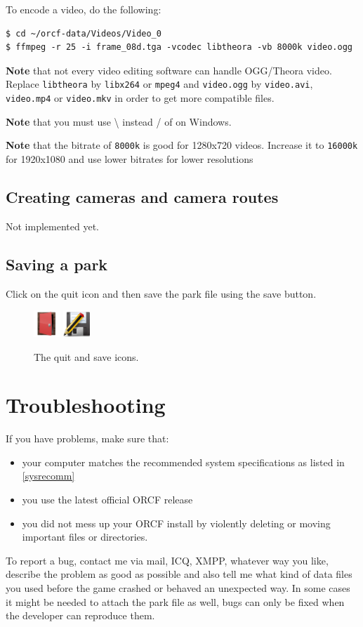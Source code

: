 \documentclass[a4paper]{article}
\newcommand{\cvalue}[1]{\texttt{#1}}
\newcommand{\note}[1]{\textbf{Note} #1 \par}
\begin{document}
To encode a video, do the following:
\begin{lstlisting}
$ cd ~/orcf-data/Videos/Video_0
$ ffmpeg -r 25 -i frame_08d.tga -vcodec libtheora -vb 8000k video.ogg
\end{lstlisting}

\note{that not every video editing software can handle OGG/Theora video. Replace \cvalue{libtheora} by \cvalue{libx264} or \cvalue{mpeg4} and
\cvalue{video.ogg} by \cvalue{video.avi}, \cvalue{video.mp4} or \cvalue{video.mkv} in order to get more compatible files.}
\note{that you must use \textbackslash{} instead / of on Windows.}
\note{that the bitrate of \cvalue{8000k} is good for 1280x720 videos. Increase it to \cvalue{16000k} for 1920x1080 and use lower bitrates
for lower resolutions}

\subsection{Creating cameras and camera routes}
Not implemented yet.

\subsection{Saving a park}
Click on the quit icon and then save the park file using the save button.
\begin{figure}[h]
  \begin{center}
    \includegraphics[width=10mm]{../images/leave.png}
    \includegraphics[width=10mm]{../images/document-save-as.png}
  \end{center}
  \caption{The quit and save icons.}
\end{figure}

\section{Troubleshooting}
If you have problems, make sure that:
\begin{itemize}
  \item your computer matches the recommended system specifications as listed in \ref{sysrecomm}
  \item you use the latest official ORCF release
  \item you did not mess up your ORCF install by violently deleting or moving important files or directories.
\end{itemize}

To report a bug, contact me via mail, ICQ, XMPP, whatever way you like, describe the problem as good as possible and also tell me what kind
of data files you used before the game crashed or behaved an unexpected way. In some cases it might be needed to attach the park file as well,
bugs can only be fixed when the developer can reproduce them.
\end{document}
